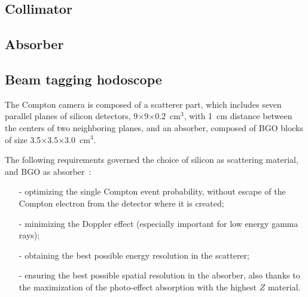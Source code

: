 \subsection{Collimator}\label{chap3::subsec::collimator} 

\subsection{Absorber}\label{chap3::subsec::absorber}

\subsection{Beam tagging hodoscope}\label{chap3::subsec::hodoscope}







The Compton camera is composed of a scatterer part, which includes seven parallel planes of silicon detectors, 9$\times$9$\times$0.2~cm$^{3}$, with 1~cm distance between the centers of two neighboring planes, and an absorber, composed of BGO blocks of size 3.5$\times$3.5$\times$3.0~cm$^{3}$. 


The following requirements governed the choice of silicon as scattering material, and BGO as absorber~\parencite{Richard2012}:
\begin{itemize}
\item[-] optimizing the single Compton event probability, without escape of the Compton electron from the detector where it is created;
\item[-] minimizing the Doppler effect (especially important for low energy gamma rays);
\item[-] obtaining the best possible energy resolution in the scatterer;
\item[-] ensuring the best possible spatial resolution in the absorber, also thanks to the maximization of the photo-effect absorption with the highest $Z$ material.
\end{itemize}



\clearpage
